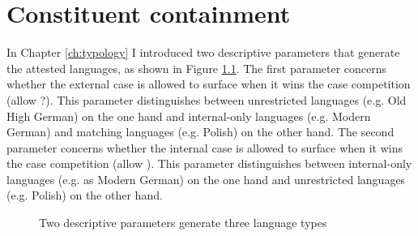 
\chapter{Constituent containment}\label{ch:relativization}

In Chapter \ref{ch:typology} I introduced two descriptive parameters that generate the attested languages, as shown in Figure \ref{fig:two-parameters}.
The first parameter concerns whether the external case is allowed to surface when it wins the case competition (allow ?). This parameter distinguishes between unrestricted languages (e.g. Old High German) on the one hand and internal-only languages (e.g. Modern German) and matching languages (e.g. Polish) on the other hand.
The second parameter concerns whether the internal case is allowed to surface when it wins the case competition (allow ). This parameter distinguishes between internal-only languages (e.g. as Modern German) on the one hand and unrestricted languages (e.g. Polish) on the other hand.

\begin{figure}[H]
  \centering
    \footnotesize{
    }
    \caption{Two descriptive parameters generate three language types}
    \label{fig:two-parameters}
\end{figure}

